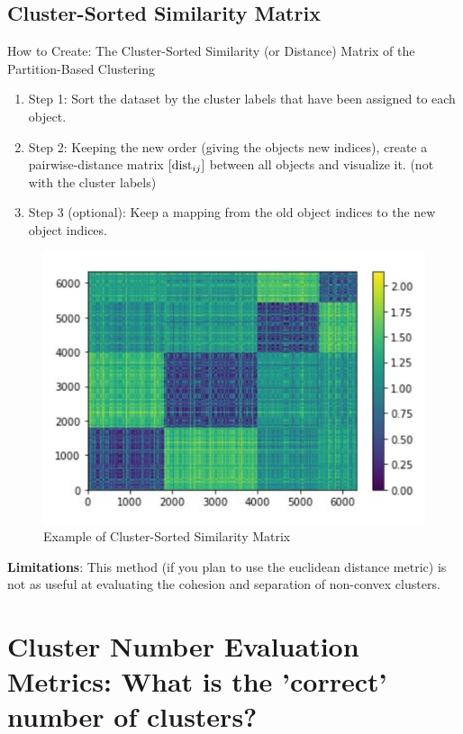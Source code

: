 \documentclass[11pt]{elegantbook}
\begin{document}
\subsection{Cluster-Sorted Similarity Matrix}
How to Create: The Cluster-Sorted Similarity (or Distance) Matrix of the Partition-Based Clustering
\begin{enumerate}[$\bullet$]
    \item Step 1: Sort the dataset by the cluster labels that have been assigned to each object.
    \item Step 2: Keeping the new order (giving the objects new indices), create a pairwise-distance matrix $\left[\textnormal{dist}_{ij}\right]$ between all objects and visualize it. (not with the cluster labels)
    \item Step 3 (optional): Keep a mapping from the old object indices to the new object indices.
\end{enumerate}
\begin{center}\begin{figure}[htbp]
    \centering
    \includegraphics[scale=0.25]{CSSM.png}
    \caption{Example of Cluster-Sorted Similarity Matrix}
    \label{}
\end{figure}\end{center}
\textbf{Limitations}: This method (if you plan to use the euclidean distance metric) is not as useful at evaluating the cohesion and separation of non-convex clusters.



\section{Cluster Number Evaluation Metrics: What is the 'correct' number of clusters?}
\end{document}
